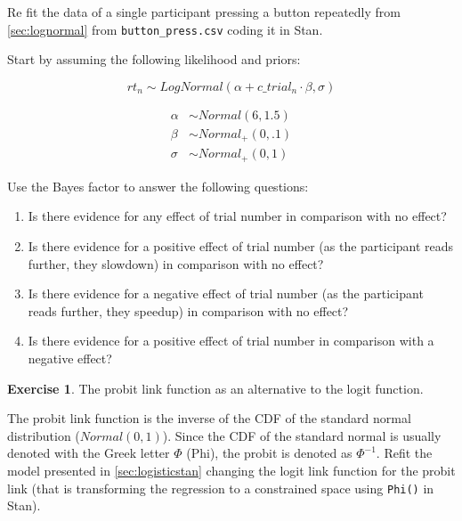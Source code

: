 \documentclass[12pt,]{krantz}
\providecommand{\tightlist}{%
  \setlength{\itemsep}{0pt}\setlength{\parskip}{0pt}}
\theoremstyle{definition}
\theoremstyle{definition}
\theoremstyle{definition}
\newtheorem{exercise}{Exercise}[chapter]
\theoremstyle{remark}
\begin{document}
Re fit the data of a single participant pressing a button repeatedly
from \ref{sec:lognormal} from \texttt{button\_press.csv} coding it in
Stan.

Start by assuming the following likelihood and priors:

\begin{equation}
rt_n \sim LogNormal(\alpha + c\_trial_n \cdot \beta,\sigma)
\end{equation}

\begin{equation}
\begin{aligned}
\alpha &\sim Normal(6, 1.5) \\
\beta &\sim Normal_+(0, .1)\\
\sigma &\sim Normal_+(0, 1)
\end{aligned}
\end{equation}

Use the Bayes factor to answer the following questions:

\begin{enumerate}
\def\labelenumi{\alph{enumi}.}
\tightlist
\item
  Is there evidence for any effect of trial number in comparison with no
  effect?
\item
  Is there evidence for a positive effect of trial number (as the
  participant reads further, they slowdown) in comparison with no
  effect?
\item
  Is there evidence for a negative effect of trial number (as the
  participant reads further, they speedup) in comparison with no effect?
\item
  Is there evidence for a positive effect of trial number in comparison
  with a negative effect?
\end{enumerate}

\begin{exercise}
\protect\hypertarget{exr:linkfunction}{}{\label{exr:linkfunction} }The
probit link function as an alternative to the logit function.
\end{exercise}

The probit link function is the inverse of the CDF of the standard
normal distribution (\(Normal(0,1)\)). Since the CDF of the standard
normal is usually denoted with the Greek letter \(\Phi\) (Phi), the
probit is denoted as \(\Phi^{-1}\). Refit the model presented in
\ref{sec:logisticstan} changing the logit link function for the probit
link (that is transforming the regression to a constrained space using
\texttt{Phi()} in Stan).
\end{document}
